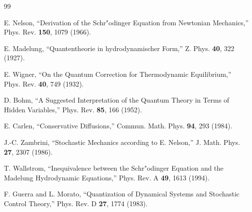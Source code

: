 \documentclass[11pt]{article}
\begin{document}
\begin{thebibliography}{99}

E. Nelson,
``Derivation of the Schr"odinger Equation from Newtonian Mechanics,''
Phys. Rev. \textbf{150}, 1079 (1966).

E. Madelung,
``Quantentheorie in hydrodynamischer Form,''
Z. Phys. \textbf{40}, 322 (1927).

E. Wigner,
``On the Quantum Correction for Thermodynamic Equilibrium,''
Phys. Rev. \textbf{40}, 749 (1932).

D. Bohm,
``A Suggested Interpretation of the Quantum Theory in Terms of Hidden Variables,''
Phys. Rev. \textbf{85}, 166 (1952).

E. Carlen,
``Conservative Diffusions,''
Commun. Math. Phys. \textbf{94}, 293 (1984).

J.-C. Zambrini,
``Stochastic Mechanics according to E. Nelson,''
J. Math. Phys. \textbf{27}, 2307 (1986).

T. Wallstrom,
``Inequivalence between the Schr"odinger Equation and the Madelung Hydrodynamic Equations,''
Phys. Rev. A \textbf{49}, 1613 (1994).

F. Guerra and L. Morato,
``Quantization of Dynamical Systems and Stochastic Control Theory,''
Phys. Rev. D \textbf{27}, 1774 (1983).

\end{thebibliography}
\end{document}
